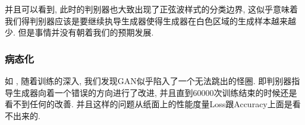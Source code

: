 \documentclass[lang=cn,11pt]{elegantpaper}
\begin{document}
并且可以看到, 此时的判别器也大致出现了正弦波样式的分类边界, 这似乎意味着我们得判别器应该是要继续执导生成器使得生成器在白色区域的生成样本越来越少. 但是事情并没有朝着我们的预期发展. 


\subsubsection{病态化}

如 , 随着训练的深入, 我们发现GAN似乎陷入了一个无法跳出的怪圈. 即判别器指导生成器向着一个错误的方向进行了改进, 并且直到60000次训练结束的时候还是看不到任何的改善. 并且这样的问题从纸面上的性能度量Loss跟Accuracy上面是看不出来的.
\end{document}
